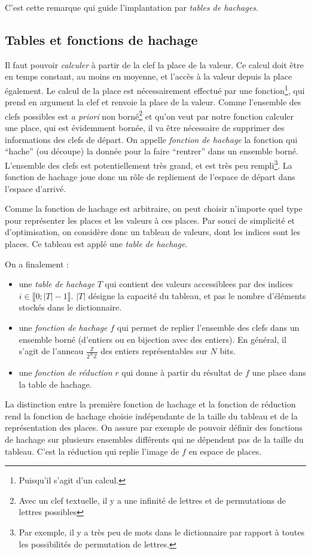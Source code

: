\documentclass[../../../main.tex]{subfiles}
\begin{document}
C'est cette remarque qui guide l'implantation par \textit{tables de hachages}. 
\subsection{Tables et fonctions de hachage}
Il faut pouvoir \textit{calculer} à partir de la clef la place de la valeur. Ce calcul doit être en temps constant, au moins en moyenne, et l'accès à la valeur depuis la place également. Le calcul de la place est nécessairement effectué par une fonction\footnote{Puisqu'il s'agit d'un calcul.}, qui prend en argument la clef et renvoie la place de la valeur. Comme l'ensemble des clefs possibles est \textit{a priori} non borné\footnote{Avec un clef textuelle, il y a une infinité de lettres et de permutations de lettres possibles} et qu'on veut par notre fonction calculer une place, qui est évidemment bornée, il va être nécessaire de supprimer des informations des clefs de départ. On appelle \textit{fonction de hachage} la fonction qui ``hache'' (ou découpe) la donnée pour la faire ``rentrer'' dans un ensemble borné. L'ensemble  des clefs est potentiellement très grand, et est très peu rempli\footnote{Par exemple, il y a très peu de mots dans le dictionnaire par rapport à toutes les possibilités de permutation de lettres.}. La fonction de hachage joue donc un rôle de repliement de l'espace de départ dans l'espace d'arrivé.

Comme la fonction de hachage est arbitraire, on peut choisir n'importe quel type pour représenter les places et les valeurs à ces places. Par souci de simplicité et d'optimisation, on considère donc un tableau de valeurs, dont les indices sont les places. Ce tableau est applé une \textit{table de hachage}.

On a finalement :
\begin{itemize}
	\item une \textit{table de hachage} $T$ qui contient des valeurs accessiblees par des indices $i\in\llbracket 0; |T|-1\rrbracket$. $|T|$ désigne la capacité du tableau, et pas le nombre d'éléments stockés dans le dictionnaire.
	\item une \textit{fonction de hachage} $f$ qui permet de replier l'ensemble des clefs dans un ensemble borné (d'entiers ou en bijection avec des entiers). En général, il s'agit de l'anneau $\frac{\mathbb{Z}}{2^{N}\mathbb{Z}}$ des entiers représentables sur $N$ bits.
	\item une \textit{fonction de réduction} $r$ qui donne à partir du résultat de $f$ une place dans la table de hachage.
\end{itemize}
La distinction entre la première fonction de hachage et la fonction de réduction rend la fonction de hachage choisie indépendante de la taille du tableau et de la représentation des places. On assure par exemple de pouvoir définir des fonctions de hachage sur plusieurs ensembles différents qui ne dépendent pas de la taille du tableau. C'est la réduction qui replie l'image de $f$ en espace de places.
\end{document}
